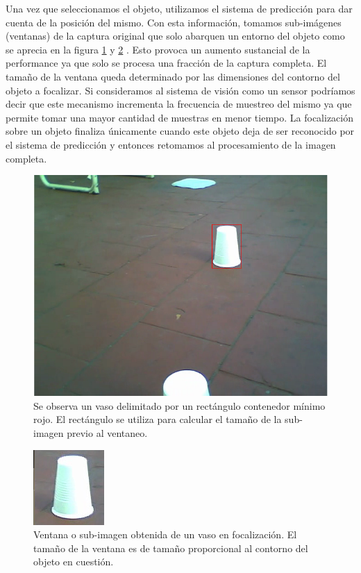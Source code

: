 	\indent Una vez que seleccionamos el objeto, utilizamos el sistema de 
	predicción para dar cuenta de la posición del mismo. Con esta 
	información, tomamos sub-imágenes (ventanas) de la captura original 
	que solo abarquen un entorno del objeto como se aprecia en la figura 
	\ref{fig:ventaneo} y \ref{fig:ventaneo_2} . Esto provoca un aumento sustancial de la performance ya que solo se procesa una fracción de la captura completa. El tamaño de la ventana queda determinado por las dimensiones del contorno del objeto a focalizar. Si consideramos al sistema de visión como un sensor podríamos decir que este mecanismo incrementa la frecuencia de muestreo del mismo ya que permite tomar una mayor cantidad de muestras en menor tiempo. La focalización sobre un objeto finaliza únicamente cuando este objeto deja de ser reconocido por el sistema de predicción y entonces retomamos al  procesamiento de la imagen completa. 

\begin{figure}[htpb]
\begin{center}
  \includegraphics[scale=0.4]{figuras/ventana-1.png}
\end{center}
  \caption{\small Se observa un vaso delimitado por un rectángulo 
  contenedor mínimo rojo. El rectángulo se utiliza para calcular el 
  tamaño de la sub-imagen previo al ventaneo.}
  \label{fig:ventaneo}
\end{figure}


\begin{figure}[htpb]
\begin{center}
  \includegraphics[scale=0.6]{figuras/ventana-2.png}
\end{center}
  \caption{\small Ventana o sub-imagen obtenida de un vaso en 
  focalización. El tamaño de la ventana es de tamaño proporcional al 
  contorno del objeto en cuestión.}
  \label{fig:ventaneo_2}
\end{figure}


